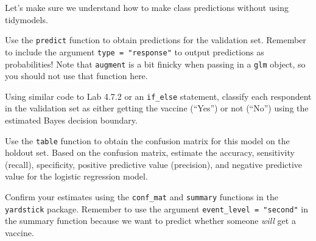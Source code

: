 \documentclass[
]{article}
\begin{document}
Let's make sure we understand how to make class predictions without
using tidymodels.

Use the \texttt{predict} function to obtain predictions for the
validation set. Remember to include the argument
\texttt{type\ =\ "response"} to output predictions as probabilities!
Note that \texttt{augment} is a bit finicky when passing in a
\texttt{glm} object, so you should not use that function here.

Using similar code to Lab 4.7.2 or an \texttt{if\_else} statement,
classify each respondent in the validation set as either getting the
vaccine (``Yes'') or not (``No'') using the estimated Bayes decision
boundary.

Use the \texttt{table} function to obtain the confusion matrix for this
model on the holdout set. Based on the confusion matrix, estimate the
accuracy, sensitivity (recall), specificity, positive predictive value
(precision), and negative predictive value for the logistic regression
model.

Confirm your estimates using the \texttt{conf\_mat} and \texttt{summary}
functions in the \texttt{yardstick} package. Remember to use the
argument \texttt{event\_level\ =\ "second"} in the summary function
because we want to predict whether someone \emph{will} get a vaccine.
\end{document}
